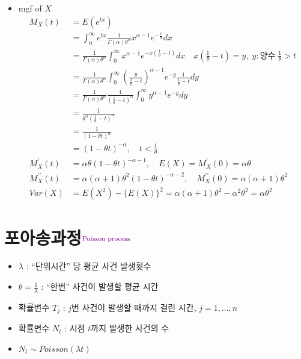 \documentclass{oblivoir}
\newcommand{\DC}[1]{\textcolor{DarkMagenta}{#1}}%
\newcommand{\UP}[1]{$^{\mbox{\DC{\footnotesize #1}}}$}
\begin{document}
\begin{itemize}
\item mgf of $X$
\begin{align*}
M_X(t) &= E(e^{tx}) \\
&= \int_0^{\infty} e^{tx} \frac{1}{\Gamma(\alpha) \theta^{\alpha}} x^{\alpha - 1} e^{-\frac{x}{\theta}}dx \\
&= \frac{1}{\Gamma(\alpha) \theta^{\alpha}} \int_0^{\infty} x^{\alpha - 1} e^{-x(\frac{1}{\theta} - t)} dx
\quad x(\frac{1}{\theta} - t) = y, \; y : \mbox{양수} \; \frac{1}{\theta} > t \\
&= \frac{1}{\Gamma(\alpha) \theta^{\alpha}} \int_0^{\infty} (\frac{y}{\frac{1}{\theta} - t})^{\alpha - 1} e^{-y} \frac{1}{\frac{1}{\theta} - t} dy \\
&= \frac{1}{\Gamma(\alpha) \theta^{\alpha}} \frac{1}{(\frac{1}{\theta} - t)^{\alpha}} \int_0^{\infty} y^{\alpha - 1} e^{-y}dy\\
&= \frac{1}{\theta^{\alpha} (\frac{1}{\theta} - t)^{\alpha}} \\
&= \frac{1}{(1 - \theta t)^{\alpha}}\\
& = (1 - \theta t)^{- \alpha}, \quad t < \frac{1}{\theta} \\
M_X^{\prime}(t) &= \alpha \theta (1-\theta t)^{- \alpha - 1}, \quad E(X) = M_X^{\prime}(0) = \alpha \theta \\
M_X^{\prime \prime}(t) &= \alpha (\alpha + 1) \theta^2 (1 - \theta t)^{-\alpha - 2}, \quad M_X^{\prime \prime}(0) = \alpha (\alpha + 1) \theta^2 \\
Var(X) &= E(X^2) - \{E(X) \}^2 = \alpha (\alpha + 1) \theta^2 - \alpha^2 \theta^2 = \alpha \theta^2
\end{align*}
\end{itemize}

\section{포아송과정\UP{Poisson process}}
\begin{itemize}
\item $\lambda$ : ``단위시간'' 당 평균 사건 발생횟수
\item $\theta = \frac{1}{\lambda}$ : ``한번'' 사건이 발생할 평균 시간
\item 확률변수 $T_j$ : $j$번 사건이 발생할 때까지 걸린 시간, $j = 1, \ldots, n$
\item 확률변수 $N_t$ : 시점 $t$까지 발생한 사건의 수
\item $N_t \sim Poisson(\lambda t)$
\end{itemize}
\end{document}
